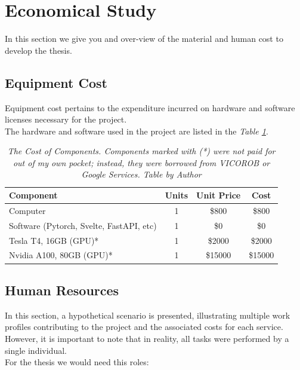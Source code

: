 \section{Economical Study}

In this section we give you and over-view of the material and human cost to
develop the thesis.

\subsection{Equipment Cost}

Equipment cost pertains to the expenditure incurred on hardware and software
licenses necessary for the project. \\

The hardware and software used in the project are listed in the \textit{Table
\ref{table:equipment_cost}}.

\begin{table}[H]
  \centering
  \begin{tabular}{lccc}
    \toprule
    \textbf{Component} & \textbf{Units} & \textbf{Unit Price} & \textbf{Cost} \\
    \midrule
    Computer & 1 & \$800 & \$800 \\
    Software (Pytorch, Svelte, FastAPI, etc) & 1 & \$0 & \$0 \\
    Tesla T4, 16GB (GPU)* & 1 & \$2000 & \$2000 \\
    Nvidia A100, 80GB (GPU)* & 1 & \$15000 & \$15000 \\
    \bottomrule
  \end{tabular}
  \caption[The Cost of Components.]
  {\textit{The Cost of Components.
  Components marked with (*) were not paid for out of my own pocket; instead, they were borrowed from VICOROB or
  Google Services. Table by Author}}
  {\label{table:equipment_cost}}
\end{table}

\subsection{Human Resources}

In this section, a hypothetical scenario is presented, illustrating multiple
work profiles contributing to the project and the associated costs for each
service. However, it is important to note that in reality, all tasks were
performed by a single individual. \\

For the thesis we would need this roles: \\

